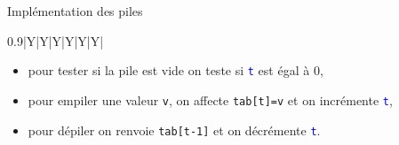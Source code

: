 \documentclass[10pt]{beamer}
\begin{document}
\begin{frame}[fragile]{\Ctitle}{\stitle}
\begin{block}{Implémentation des piles}
\begin{itemize}
{\begin{tabularx}{0.9\textwidth}{|Y|Y|Y|Y|Y|Y|}
					\end{tabularx}
				}
				\begin{itemize}
					\item<8-> pour tester si la pile est vide on teste si \textcolor{blue}{\tt t} est égal à 0,
					\item<9-> pour empiler une valeur {\tt v}, on affecte {\tt tab[t]=v} et on incrémente \textcolor{blue}{\tt t},
						\onslide<10->{\ncline[linecolor=OliveGreen,nodesepA=0.1cm,nodesepB=0.4cm,offset=-2pt]{->}{s}{t} \naput[labelsep=0.1pt]{\textcolor{OliveGreen}{\tiny empiler}}}
					\item<11-> pour dépiler on renvoie {\tt tab[t-1]} et on décrémente \textcolor{blue}{\tt t}.
						\onslide<12->{\ncline[linecolor=BrickRed,nodesepA=0.1cm,nodesepB=0.4cm,offset=2pt]{->}{s}{h} \nbput[labelsep=0.1pt]{\textcolor{BrickRed}{\tiny dépiler}}}
				\end{itemize}
		\end{itemize}
	\end{block}
\end{frame}
\end{document}
